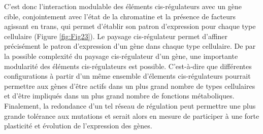 C’est donc l’interaction modulable des éléments \gls{cis}-régulateurs avec un gène cible, conjointement avec l’état de la chromatine et la présence de facteurs agissant en \gls{trans}, qui permet d’établir son patron d’expression pour chaque type cellulaire (Figure \ref{fig:Fig23}). Le paysage \gls{cis}-régulateur permet d’affiner précisément le patron d’expression d’un gène dans chaque type cellulaire. De par la possible complexité du paysage \gls{cis}-régulateur d'un gène, une importante modularité des éléments \gls{cis}-régulateurs est possible. C'est-à-dire que différentes configurations à partir d'un même ensemble d'élements \gls{cis}-régulateurs pourrait permettre aux gènes d’être actifs dans un plus grand nombre de types cellulaires et d’être impliqués dans un plus grand nombre de fonctions métaboliques. Finalement, la redondance d’un tel réseau de régulation peut permettre une plus grande tolérance aux mutations et serait alors en mesure de participer à une forte plasticité et évolution de l’expression des gènes.

